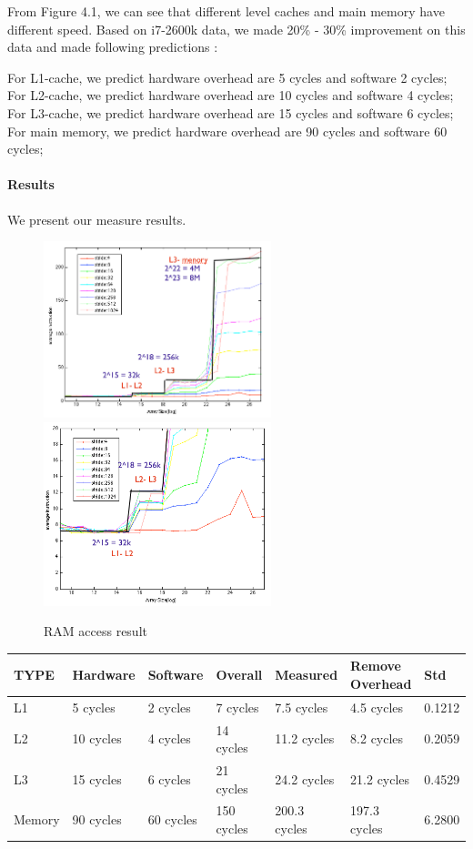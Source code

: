 From Figure 4.1, we can see that different level caches and main memory have different speed.  Based on i7-2600k data, we made 20\% - 30\% improvement on this data and made following predictions : 

For L1-cache, we predict hardware overhead are 5 cycles and software 2 cycles;
For L2-cache, we predict hardware overhead are 10 cycles and software 4 cycles;
For L3-cache, we predict hardware overhead are 15 cycles and software 6 cycles;
For main memory, we predict hardware overhead are 90 cycles and software 60 cycles;

\paragraph{Results}
We present our measure results.

\begin {figure}
\centering
\includegraphics[width=2.6in]{./pics/ram1.png}
\includegraphics[width=2.6in]{./pics/ram2.png}
\caption{RAM access result}\label{RAM access}
\end{figure}

\begin{center}
\begin{tabular}{| p{1.5cm} | p{2cm} | p{2cm} | p{2cm} | p{2.5cm} | p{3cm} | p{2cm}}
TYPE             & Hardware  & Software  & Overall  & Measured  & Remove Overhead & Std\\
\hline

L1	&   5 cycles  & 2 cycles & 7 cycles  &  7.5  cycles &  4.5 cycles & 0.1212\\
L2    &   10 cycles & 4 cycles & 14 cycles & 11.2 cycles &  8.2 cycles & 0.2059\\
L3 	&   15 cycles & 6 cycles & 21 cycles &  24.2 cycles & 21.2 cycles & 0.4529\\
Memory & 90 cycles & 60 cycles & 150 cycles & 200.3 cycles & 197.3 cycles & 6.2800\\
\end{tabular}
\end{center}

